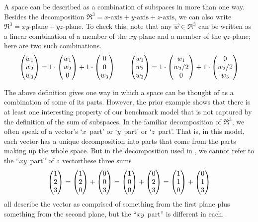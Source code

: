 \begin{example} \label{exam:RThreeIsSumXYAndYZ}
A space can be described as a combination of subspaces in more than one way.
Besides the decomposition 
$\Re^3=\text{$x$-axis}+\text{$y$-axis}+\text{$z$-axis}$,
we can also write
$\Re^3=\text{$xy$-plane}+\text{$yz$-plane}$.
To check this, note that any $\vec{w}\in\Re^3$ can be written
as a linear combination of a member of the $xy$-plane and a member of the
$yz$-plane; here are two such combinations.  
\begin{equation*}
  \begin{pmatrix} w_1 \\ w_2 \\ w_3 \end{pmatrix}
  =1\cdot\begin{pmatrix} w_1 \\ w_2 \\ 0 \end{pmatrix}
   +1\cdot\begin{pmatrix} 0 \\ 0 \\ w_3 \end{pmatrix}
  \qquad
  \begin{pmatrix} w_1 \\ w_2 \\ w_3 \end{pmatrix}
  =1\cdot\begin{pmatrix} w_1 \\ w_2/2 \\ 0 \end{pmatrix}
   +1\cdot\begin{pmatrix} 0 \\ w_2/2 \\ w_3 \end{pmatrix}
\end{equation*}
\end{example}

The above definition gives one way in which a space can 
be thought of as a combination of some of its parts.
However, the prior example shows that there is at least one interesting
property of our benchmark model that is not captured by
the definition of the sum of subspaces.
In the familiar decomposition of $\Re^3$,
we often speak of a vector's `$x$~part' or `$y$~part' or 
`$z$~part'.
That is, in this model, each vector has a unique decomposition into
parts that come from the parts making up the whole space.
But in the decomposition used in , we
cannot refer to the ``$xy$~part'' of a vector\Dash these three sums
\begin{equation*}
  \begin{pmatrix} 1 \\ 2 \\ 3 \end{pmatrix}
  =\begin{pmatrix} 1 \\ 2 \\ 0 \end{pmatrix}
  +\begin{pmatrix} 0 \\ 0 \\ 3 \end{pmatrix}
  =\begin{pmatrix} 1 \\ 0 \\ 0 \end{pmatrix}
  +\begin{pmatrix} 0 \\ 2 \\ 3 \end{pmatrix} 
  =\begin{pmatrix} 1 \\ 1 \\ 0 \end{pmatrix}
  +\begin{pmatrix} 0 \\ 1 \\ 3 \end{pmatrix} 
\end{equation*}
all describe the vector as comprised of something from the first plane plus
something from the second plane, but the ``$xy$~part'' is different in each.


